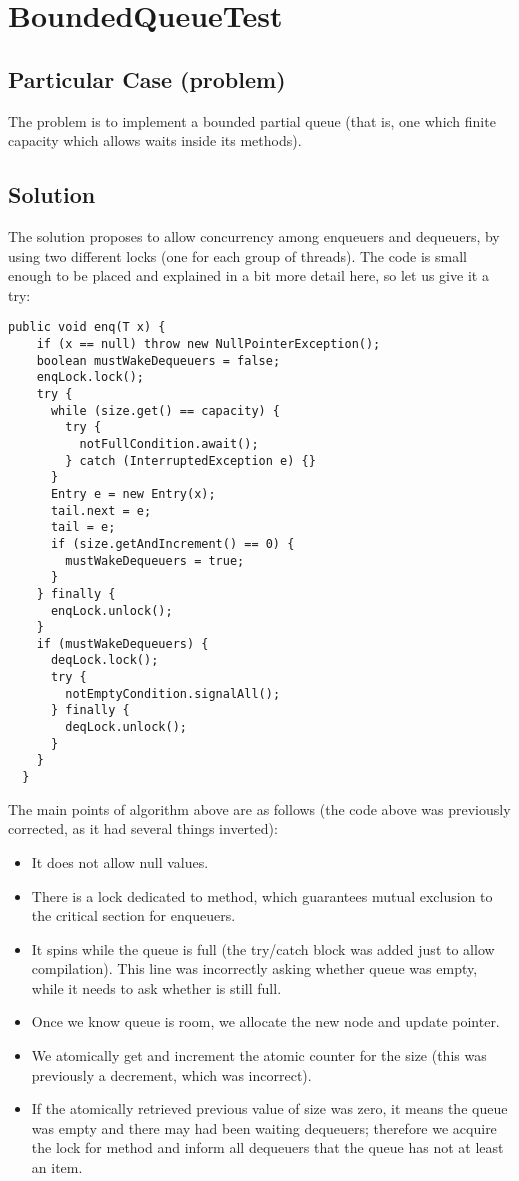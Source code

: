 \newpage
\section{\textbf{BoundedQueueTest}}

\subsection{Particular Case (problem)}
The problem is to implement a bounded partial queue (that is, one
which finite capacity which allows waits inside its methods). 

\subsection{Solution}
The solution proposes to allow concurrency among enqueuers and
dequeuers, by using two different locks (one for each group of
threads). The code is small enough to be placed and explained in a bit
more detail here, so let us give it a try:

\begin{lstlisting}[style=numbers]
  public void enq(T x) {
    if (x == null) throw new NullPointerException();
    boolean mustWakeDequeuers = false;
    enqLock.lock();
    try {
      while (size.get() == capacity) {
        try {
          notFullCondition.await();
        } catch (InterruptedException e) {}
      }
      Entry e = new Entry(x);
      tail.next = e;
      tail = e;
      if (size.getAndIncrement() == 0) {
        mustWakeDequeuers = true;
      }
    } finally {
      enqLock.unlock();
    }
    if (mustWakeDequeuers) {
      deqLock.lock();
      try {
        notEmptyCondition.signalAll();
      } finally {
        deqLock.unlock();
      }
    }
  }
\end{lstlisting}
\hfill

The main points of algorithm above are as follows (the code above was
previously corrected, as it had several things inverted):

\begin{itemize}
\item It does not allow null values.
\item There is a lock dedicated to  method, which guarantees
  mutual exclusion to the critical section for enqueuers.
\item It spins while the queue is full (the try/catch block was added
  just to allow compilation). This line was incorrectly asking whether
  queue was empty, while it needs to ask whether is still full.
\item  Once we know queue is room, we allocate the new node and update
   pointer.
\item We atomically get and increment the atomic counter for the size
  (this was previously a decrement, which was incorrect).
\item If the atomically retrieved previous value of size was zero, it
  means the queue was empty and there may had been waiting dequeuers;
  therefore we acquire the lock for  method and inform all
  dequeuers that the queue has not at least an item.
\end{itemize}
\hfill

